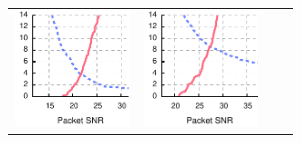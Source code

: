 \begin{figure}[p]
\begin{leftfullpage}
\begin{tabular}{cccc}
	\includegraphics[height=1.2in]{figures/delivery_figures/goodbad/packet_snr_goodbad_6.pdf} &
	\includegraphics[height=1.2in]{figures/delivery_figures/goodbad/packet_snr_goodbad_7.pdf} \\


\end{tabular}
\end{leftfullpage}
\end{figure}
